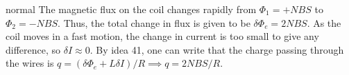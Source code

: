 \begin{solution}{normal}
The magnetic flux on the coil changes rapidly from $\Phi_1 = +NBS$ to $\Phi_2 = -NBS$. Thus, the total change in flux is given to be $\delta \Phi_e = 2NBS$. As the coil moves in a fast motion, the change in current is too small to give any difference, so $\delta I \approx 0$. By idea 41, one can write that the charge passing through the wires is $q = (\delta \Phi_e + L\delta I)/R\implies q = 2NBS/R$.
\end{solution}